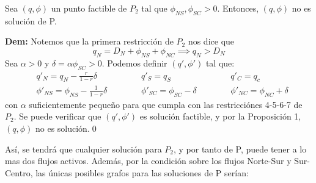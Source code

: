 \documentclass[12pt,twoside]{article}
\newenvironment{proposicion}[2][\(\blacksquare\) Proposici\'on]{\begin{trivlist}
		\item[\hskip \labelsep {\bfseries #1}\hskip \labelsep {\bfseries #2.}]}{\end{trivlist}}
\begin{document}
	\begin{proposicion}{4} Sea \((q,\phi)\) un punto factible de \(P_2\) tal que \(\phi_{NS},\phi_{SC}>0\). Entonces, \((q,\phi)\) no es soluci\'on de P.
		
		\textbf{Dem:} Notemos que la primera restricci\'on de \(P_2\) nos dice que
		$$
		q_N=D_N+\phi_{NS}+\phi_{NC}\implies q_N>D_N
		$$
		Sea \(\alpha>0\) y \(\delta=\alpha\phi_{SC}>0\). Podemos definir \((q',\phi')\) tal que:
		\begin{equation*}
			\begin{aligned}
				&  q'_N=q_N-\frac{r}{1-r}\delta & \hspace{1cm} &  q'_S=q_S & \hspace{1cm} &  q'_C=q_c \\
				& \phi'_{NS}=\phi_{NS}-\frac{1}{1-r}\delta & \hspace{1cm} & \phi'_{SC}=\phi_{SC}-\delta & \hspace{1cm} & \phi'_{NC}=\phi_{NC}+\delta
			\end{aligned}
		\end{equation*}
		con \(\alpha\) suficientemente peque\~{n}o para que cumpla con las restricci\'ones 4-5-6-7 de \(P_2\). Se puede verificar que \((q',\phi')\) es soluci\'on factible, y por la Proposici\'on 1, \((q,\phi)\) no es soluci\'on.\qed
	\end{proposicion}
	
	\vspace{0.4cm}
	\hspace{1cm} As\'i, se tendr\'a que cualquier soluci\'on para \(P_2\), y por tanto de P, puede tener a lo mas dos flujos activos. Adem\'as, por la condici\'on sobre los flujos Norte-Sur y Sur-Centro, las \'unicas posibles grafos para las soluciones de P ser\'ian:
	\vspace{0.4cm}
	
\end{document}
